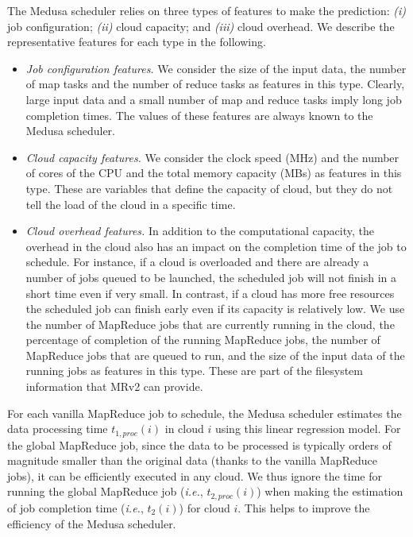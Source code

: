 \documentclass[10pt, conference, compsocconf]{IEEEtran}
\begin{document}
The Medusa scheduler relies on three types of features to make the prediction: \textit{(i)} job configuration; \textit{(ii)} cloud capacity; and \textit{(iii)} cloud overhead. We describe the representative features for each type in the following.
\begin{itemize}
    \item \textit{Job configuration features.} We consider the size of the input data, the number of map tasks and the number of reduce tasks as features in this type. Clearly, large input data and a small number of map and reduce tasks imply long job completion times. The values of these features are always known to the Medusa scheduler.
    \item \textit{Cloud capacity features.} We consider the clock speed (MHz) and the number of cores of the CPU and the total memory capacity (MBs) as features in this type.
    These are variables that define the capacity of cloud, but they do not tell the load of the cloud in a specific time.
    \item \textit{Cloud overhead features.} In addition to the computational capacity, the overhead in the cloud also has an impact on the completion time of the job to schedule. For instance, if a cloud is overloaded and there are already a number of jobs queued to be launched, the scheduled job will not finish in a short time even if very small. In contrast, if a cloud has more free resources the scheduled job can finish early even if its capacity is relatively low. We use the number of MapReduce jobs that are currently running in the cloud, the percentage of completion of the running MapReduce jobs, the number of MapReduce jobs that are queued to run, and the size of the input data of the running jobs as features in this type. These are part of the filesystem information that MRv2 can provide.
\end{itemize}

For each vanilla MapReduce job to schedule, the Medusa scheduler estimates the data processing time $t_{1, proc}(i)$ in cloud $i$ using this linear regression model.
For the global MapReduce job, since the data to be processed is typically orders of magnitude smaller than the original data (thanks to the vanilla MapReduce jobs), it can be efficiently executed in any cloud.
We thus ignore the time for running the global MapReduce job (\textit{i.e.}, $t_{2, proc}(i)$) when making the estimation of job completion time (\textit{i.e.}, $t_2(i)$) for cloud $i$. This helps to improve the efficiency of the Medusa scheduler.
\end{document}
